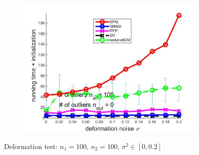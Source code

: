 \documentclass[
	fontsize=12pt,
	paper=a4,
	twoside=false,
	numbers=noenddot,
	plainheadsepline,
	toc=listof,
	toc=bibliography
]{scrartcl}
\begin{document}
\begin{figure}[h]
\begin{subfigure}[b]{0.3\textwidth}
		\includegraphics[scale=0.25]{"fig_ver2608/syntheticPointSets/ver4.3.1/deformation/time_summary_avg10t"} 
	\end{subfigure} 	
	\caption{Deformation test: $n_1=100$, $n_2=100$, $\sigma^2\in[0, 0.2]$}
	\label{fig:test1_ver431}
\end{figure}

\FloatBarrier	
\end{document}
